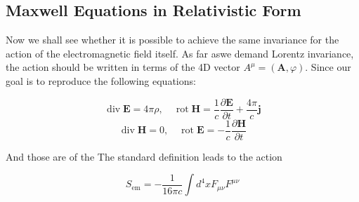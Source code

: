 \subsection{Maxwell Equations in Relativistic Form}
Now we shall see whether it is possible to achieve the same invariance for the action
of the electromagnetic field itself. As far aswe demand Lorentz invariance, the action
should be written in terms of the 4D vector $A^{\mu}=(\mathbf{A},\varphi)$. Since our goal is to reproduce the following equations:
\begin{qt}
    $$\operatorname{div} \mathbf{E}=4 \pi \rho, \quad \operatorname{rot} \mathbf{H}=\frac{1}{c} \frac{\partial \mathbf{E}}{\partial t}+\frac{4 \pi}{c} \mathbf{j}$$
\[
\operatorname{div} \mathbf{H}=0, \quad \operatorname{rot} \mathbf{E}=-\frac{1}{c} \frac{\partial \mathbf{H}}{\partial t}
\]
\end{qt}
And those are of the  The standard definition leads to the action
\begin{qt}
    \begin{equation}
S_{\mathrm{em}}=-\frac{1}{16 \pi c} \int d^{4} x F_{\mu \nu} F^{\mu \nu}
\label{em-field-action}
\end{equation}
\end{qt}

